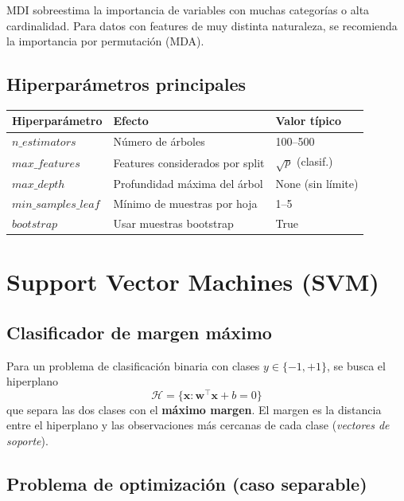\documentclass[12pt, a4paper]{article}
\theoremstyle{definition}
\theoremstyle{plain}
\theoremstyle{remark}
\newcommand{\bx}{\bm{x}}
\newcommand{\bw}{\bm{w}}
\begin{document}
\begin{alerta}
  MDI sobreestima la importancia de variables con muchas categorías o alta cardinalidad. Para datos con features de muy distinta naturaleza, se recomienda la importancia por permutación (MDA).
\end{alerta}

\subsection{Hiperparámetros principales}

\begin{center}
\begin{tabular}{lll}
  \toprule
  \textbf{Hiperparámetro} & \textbf{Efecto} & \textbf{Valor típico} \\
  \midrule
  $n\_estimators$ & Número de árboles & 100--500 \\
  $max\_features$ & Features considerados por split & $\sqrt{p}$ (clasif.) \\
  $max\_depth$ & Profundidad máxima del árbol & None (sin límite) \\
  $min\_samples\_leaf$ & Mínimo de muestras por hoja & 1--5 \\
  $bootstrap$ & Usar muestras bootstrap & True \\
  \bottomrule
\end{tabular}
\end{center}

\section{Support Vector Machines (SVM)}

\subsection{Clasificador de margen máximo}

Para un problema de clasificación binaria con clases $y \in \{-1, +1\}$, se busca el hiperplano
\[
  \mathcal{H} = \{\bx : \bw^\top \bx + b = 0\}
\]
que separa las dos clases con el \textbf{máximo margen}. El margen es la distancia entre el hiperplano y las observaciones más cercanas de cada clase (\textit{vectores de soporte}).

\subsection{Problema de optimización (caso separable)}
\end{document}
